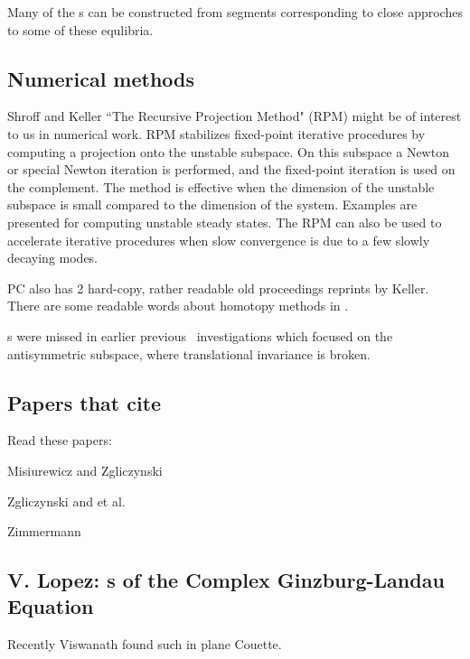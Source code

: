 
Many of the \rpo s can be constructed from segments corresponding to
close approches to some of these equlibria.

\subsection{Numerical methods}

Shroff and Keller
``The Recursive Projection Method" (RPM)
might be of interest to us in numerical work.
RPM stabilizes fixed-point iterative 
procedures by computing a projection onto the unstable subspace.
On this subspace a Newton or special Newton iteration is performed, 
and the fixed-point iteration is used on the complement. 
The method is effective when the dimension of the unstable subspace 
is small compared to the dimension of the system.
Examples are presented for computing unstable steady states.
The RPM can also be used to accelerate iterative procedures when 
slow convergence is due to a few slowly decaying modes.

PC also has 2 hard-copy, rather readable
old proceedings reprints by Keller.
There are some readable words about homotopy methods in
.

{\Rpo s} were missed in earlier 
previous \KS\ investigations%
which focused on the antisymmetric subspace, where translational invariance
is broken.

\subsection*{Papers that cite }

Read these papers:

Misiurewicz and Zgliczynski

Zgliczynski and et al.

Zimmermann

\subsection*{V. Lopez: 
        {\Rpo s} of the Complex Ginzburg-Landau Equation}

        Recently
 Viswanath found such in plane Couette.

